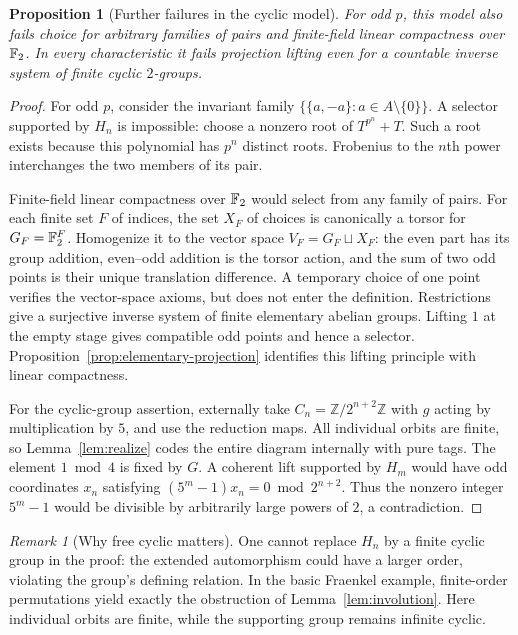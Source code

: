 \documentclass[11pt,a4paper]{article}
\newtheorem{proposition}[theorem]{Proposition}
\theoremstyle{definition}\newtheorem{definition}[theorem]{Definition}
\theoremstyle{remark}\newtheorem{remark}[theorem]{Remark}
\begin{document}
\begin{proposition}[Further failures in the cyclic model]
For odd $p$, this model also fails choice for arbitrary families of pairs and finite-field linear compactness over $\mathbb F_2$. In every characteristic it fails projection lifting even for a countable inverse system of finite cyclic $2$-groups.
\end{proposition}
\begin{proof}
For odd $p$, consider the invariant family $\{\{a,-a\}:a\in A\setminus\{0\}\}$. A selector supported by $H_n$ is impossible: choose a nonzero root of $T^{p^n}+T$. Such a root exists because this polynomial has $p^n$ distinct roots. Frobenius to the $n$th power interchanges the two members of its pair.

Finite-field linear compactness over $\mathbb F_2$ would select from any family of pairs. For each finite set $F$ of indices, the set $X_F$ of choices is canonically a torsor for $G_F=\mathbb F_2^F$. Homogenize it to the vector space $V_F=G_F\sqcup X_F$: the even part has its group addition, even--odd addition is the torsor action, and the sum of two odd points is their unique translation difference. A temporary choice of one point verifies the vector-space axioms, but does not enter the definition. Restrictions give a surjective inverse system of finite elementary abelian groups. Lifting $1$ at the empty stage gives compatible odd points and hence a selector. Proposition~\ref{prop:elementary-projection} identifies this lifting principle with linear compactness.

For the cyclic-group assertion, externally take $C_n=\mathbb Z/2^{n+2}\mathbb Z$ with $g$ acting by multiplication by $5$, and use the reduction maps. All individual orbits are finite, so Lemma~\ref{lem:realize} codes the entire diagram internally with pure tags. The element $1\bmod4$ is fixed by $G$. A coherent lift supported by $H_m$ would have odd coordinates $x_n$ satisfying $(5^m-1)x_n=0\bmod2^{n+2}$. Thus the nonzero integer $5^m-1$ would be divisible by arbitrarily large powers of $2$, a contradiction.
\end{proof}

\begin{remark}[Why free cyclic matters]
One cannot replace $H_n$ by a finite cyclic group in the proof: the extended automorphism could have a larger order, violating the group's defining relation. In the basic Fraenkel example, finite-order permutations yield exactly the obstruction of Lemma~\ref{lem:involution}. Here individual orbits are finite, while the supporting group remains infinite cyclic.
\end{remark}
\end{document}
